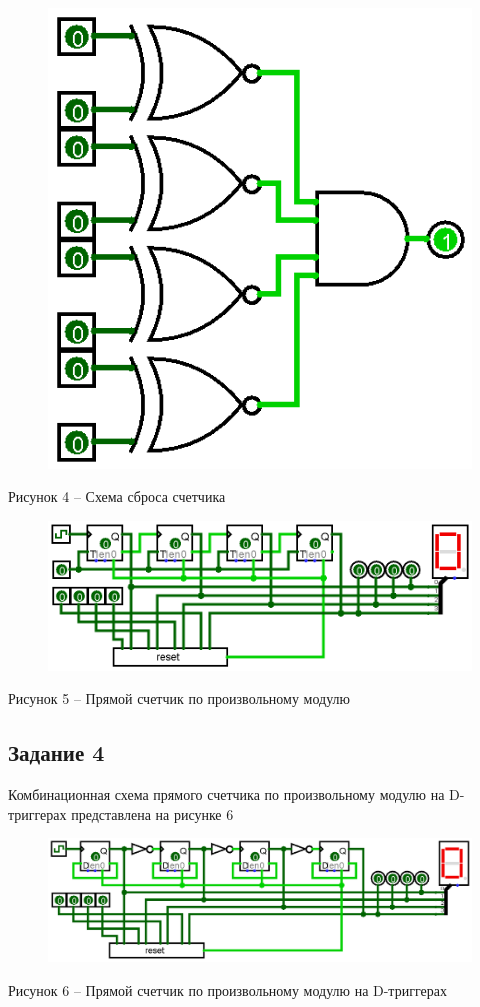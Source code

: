 \documentclass[a4paper,14pt]{extarticle}
\begin{document}
	\begin{figure}[h]
		\centering
		\includegraphics[width=0.4\linewidth]{images/s-3-1}
	\end{figure}
	\begin{center}
		Рисунок 4 – Схема сброса счетчика
	\end{center}
	
	\begin{figure}[h]
		\centering
		\includegraphics[width=0.8\linewidth]{images/s-3-2}
	\end{figure}
	\begin{center}
		Рисунок 5 – Прямой счетчик по произвольному модулю
	\end{center}
	
	\pagebreak
	\subsection*{Задание 4}
	Комбинационная схема прямого счетчика по произвольному модулю на D-триггерах представлена на рисунке 6
	
	\begin{figure}[h]
		\centering
		\includegraphics[width=0.8\linewidth]{images/s-4}
	\end{figure}
	\begin{center}
		Рисунок 6 – Прямой счетчик по произвольному модулю на D-триггерах
	\end{center}
	
\end{document}
